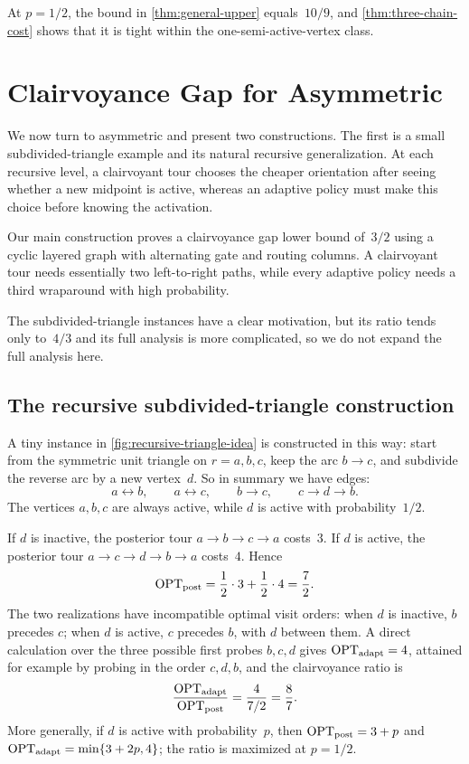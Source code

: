 \documentclass[12pt,a4paper,oneside]{report}
\begin{document}
At $p=1/2$, the bound in \cref{thm:general-upper} equals~$10/9$, and
\cref{thm:three-chain-cost} shows that it is tight within the
one-semi-active-vertex class.

\chapter{Clairvoyance Gap for Asymmetric \StochTSP{}}\label{ch:asym-clair}

We now turn to asymmetric \StochTSP{} and present two constructions.
The first is a small subdivided-triangle example and its natural recursive
generalization.  At each recursive level, a clairvoyant tour chooses the
cheaper orientation after seeing whether a new midpoint is active, whereas an
adaptive policy must make this choice before knowing the activation.

Our main construction proves a clairvoyance gap lower bound of~$3/2$ using a
cyclic layered graph with alternating gate and routing columns.  A
clairvoyant tour needs essentially two left-to-right paths, while every
adaptive policy needs a third wraparound with high probability.

The subdivided-triangle instances have a clear motivation, but its
ratio tends only to~$4/3$ and its full analysis is more complicated,
so we do not expand the full analysis here.

\section{The recursive subdivided-triangle construction}
\label{sec:recursive-construction}

A tiny instance in \cref{fig:recursive-triangle-idea} is constructed in this way:
start from the symmetric unit triangle on
$r=a,b,c$, keep the arc $b\to c$, and subdivide the reverse arc by a new
vertex~$d$. So in summary we have edges:
\[
  a\leftrightarrow b,\qquad
  a\leftrightarrow c,\qquad
  b\to c, \qquad
  c\to d\to b.
\]
The vertices $a,b,c$ are always active, while $d$ is active with probability~$1/2$.

If $d$ is inactive, the posterior tour $a\to b\to c\to a$ costs~$3$.
If $d$ is active, the posterior tour
$a\to c\to d\to b\to a$ costs~$4$.  Hence
\[
  \operatorname{OPT}_\mathrm{post}=\frac12\cdot3+\frac12\cdot4=\frac72.
\]
The two realizations have incompatible optimal visit orders: when $d$ is
inactive, $b$ precedes $c$; when $d$ is active, $c$ precedes $b$, with $d$
between them.
A direct calculation over the three possible first probes
$b,c,d$ gives $\operatorname{OPT}_\mathrm{adapt}=4$, attained for example by probing in the order $c,d,b$, and the
clairvoyance ratio is
\[
  \frac{\operatorname{OPT}_\mathrm{adapt}}{\operatorname{OPT}_\mathrm{post}}=\frac{4}{7/2}=\frac87.
\]
More generally, if $d$ is active with probability~$p$, then
$\operatorname{OPT}_\mathrm{post}=3+p$ and $\operatorname{OPT}_\mathrm{adapt}=\min\{3+2p,4\}$; the ratio is maximized at
$p=1/2$.
\end{document}
